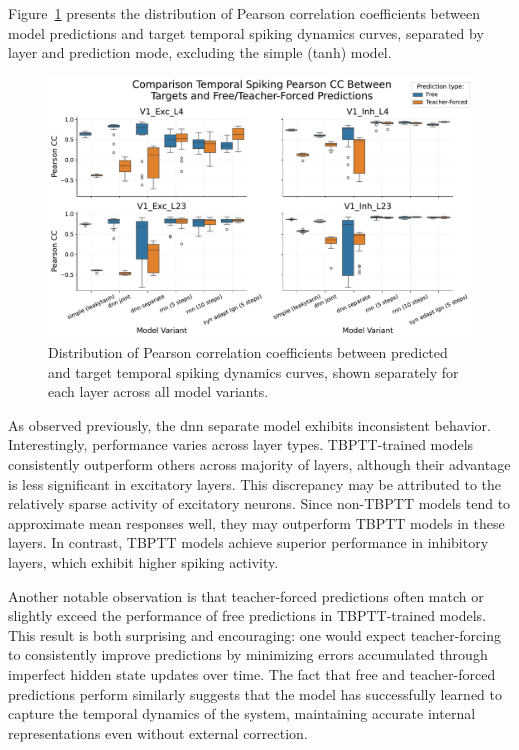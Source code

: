 Figure~\ref{fig:boxplot_models_pearson_synchrony_different_layers} presents the distribution of Pearson correlation coefficients between model predictions and target temporal spiking dynamics curves, separated by layer and prediction mode, excluding the simple (tanh) model.

\begin{figure}
    \centering
    \includegraphics[width=\linewidth]{img/plots/boxplot_model_comparison_synchrony_pearson_layers.pdf}
    \caption{Distribution of Pearson correlation coefficients between predicted and target temporal spiking dynamics curves, shown separately for each layer across all model variants.}
    \label{fig:boxplot_models_pearson_synchrony_different_layers}
\end{figure}

As observed previously, the dnn separate model exhibits inconsistent behavior. Interestingly, performance varies across layer types. TBPTT-trained models consistently outperform others across majority of layers, although their advantage is less significant in excitatory layers. This discrepancy may be attributed to the relatively sparse activity of excitatory neurons. Since non-TBPTT models tend to approximate mean responses well, they may outperform TBPTT models in these layers. In contrast, TBPTT models achieve superior performance in inhibitory layers, which exhibit higher spiking activity.


Another notable observation is that teacher-forced predictions often match or slightly exceed the performance of free predictions in TBPTT-trained models. This result is both surprising and encouraging: one would expect teacher-forcing to consistently improve predictions by minimizing errors accumulated through imperfect hidden state updates over time. The fact that free and teacher-forced predictions perform similarly suggests that the model has successfully learned to capture the temporal dynamics of the system, maintaining accurate internal representations even without external correction.

